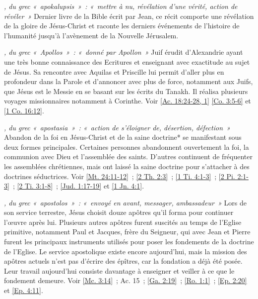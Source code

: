 \begin{multicols}{2}
\textit{, du grec «~apokalupsis~»~: «~mettre à nu, révélation d'une vérité, action de révéler~»}\newline
Dernier livre de la Bible écrit par Jean, ce récit comporte une révélation de la gloire de Jésus-Christ et raconte les derniers événements de l'histoire de l'humanité jusqu'à l'avènement de la Nouvelle Jérusalem.

\textit{, du grec «~Apollos~»~: «~donné par Apollon~»}\newline
Juif érudit d'Alexandrie ayant une très bonne connaissance des Ecritures et enseignant avec exactitude au sujet de Jésus. Sa rencontre avec Aquilas et Priscille lui permit d'aller plus en profondeur dans la Parole et d'annoncer avec plus de force, notamment aux Juifs, que Jésus est le Messie en se basant sur les écrits du Tanakh. Il réalisa plusieurs voyages missionnaires notamment à Corinthe. Voir \vref{Ac. 18:24-28, 1} \vref{Co. 3:5-6} et \vref{1 Co. 16:12}.

\textit{, du grec «~apostasia~»~: «~action de s'éloigner de, désertion, défection~»}\newline
Abandon de la foi en Jésus-Christ et de la saine doctrine* se manifestant sous deux formes principales. Certaines personnes abandonnent ouvertement la foi, la communion avec Dieu et l'assemblée des saints. D'autres continuent de fréquenter les assemblées chrétiennes, mais ont laissé la saine doctrine pour s'attacher à des doctrines séductrices. Voir \vref{Mt. 24:11-12}~; \vref{2 Th. 2:3}~; \vref{1 Ti. 4:1-3}~; \vref{2 Pi. 2:1-3}~; \vref{2 Ti. 3:1-8}~; \vref{Jud. 1:17-19} et \vref{1 Jn. 4:1}.

\textit{, du grec «~apostolos~»~: «~envoyé en avant, messager, ambassadeur~»}\newline
Lors de son service terrestre, Jésus choisit douze apôtres qu'il forma pour continuer l'œuvre après lui. Plusieurs autres apôtres furent suscités au temps de l'Eglise primitive, notamment Paul et Jacques, frère du Seigneur, qui avec Jean et Pierre furent les principaux instruments utilisés pour poser les fondements de la doctrine de l'Eglise. Le service apostolique existe encore aujourd'hui, mais la mission des apôtres actuels n'est pas d'écrire des épîtres, car la fondation a déjà été posée. Leur travail aujourd'hui consiste davantage à enseigner et veiller à ce que le fondement demeure. Voir \vref{Mc. 3:14}~; Ac. 15~; \vref{Ga. 2:19}~; \vref{Ro. 1:1}~; \vref{Ep. 2:20} et \vref{Ep. 4:11}.


\end{multicols}
